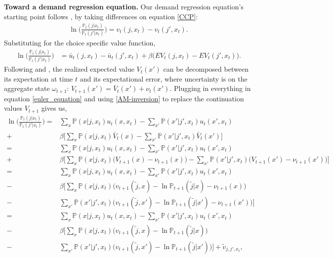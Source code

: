 \documentclass[11pt]{article}
\newcommand{\Prob}{\mathbb{P}}
\newcommand{\Paragraph}{\vspace{0.1cm}\noindent\textbf}
\begin{document}
\Paragraph{Toward a demand regression equation.} 
Our demand regression equation's starting point follows \cite{hotz1993conditional}, by taking differences on equation \eqref{CCP}:
\begin{align}
    \ln \Big( \frac{\Prob_t(j|x_{t})}{\Prob_t(j'|x_{t})}\Big)= v_t(j,x_{t})-v_t(j',x_{t}). 
\end{align} 
Substituting for the choice specific value function,
\begin{align}
    \ln \Big( \frac{\Prob_t(j|x_{t})}{\Prob_t(j'|x_{t})}\Big) &= \bar{u}_t(j,x_{t})- \bar{u}_t(j',x_{t})+\beta\big(EV_t(j,x_{t})-EV_t(j',x_{t})\big) . \label{euler_equation}
\end{align}  
Following \cite{scott2013dynamic} and \cite{kalouptsidi2021linear}, the realized expected value ${V}_t(x')$ can be decomposed between its expectation at time $t$ and its expectational error, where uncertainty is on the aggregate state $\omega_{t+1}$: $  {V}_{t+1}(x') = \bar{V}_{t}(x') + \nu_{t}(x').$ Plugging in everything in equation \eqref{euler_equation} and using \ref{AM-inversion} to replace the continuation values ${V}_{t+1}$ gives us,
\begin{align*}
 \ln \Big( \frac{\Prob_t(j|x_{t})}{\Prob_t(j'|x_{t})}\Big)=&\sum_{x} \Prob(x|j,x_{t})u_t(x,x_t)- \sum_{x'} \Prob(x'|j',x_{t})u_t(x',x_t)\nonumber \\
+&\beta\Bigg[\sum_{x} \Prob(x|j,x_{t}) \bar{V}_{t}(x) -\sum_{x'} \Prob(x'|j',x_{t}) \bar{V}_{t}(x')\Bigg] \\
=&\sum_{x} \Prob(x|j,x_{t})u_t(x,x_t)- \sum_{x'} \Prob(x'|j',x_{t})u_t(x',x_t)\nonumber \\
+&\beta\Bigg[\sum_{x} \Prob(x|j,x_{t}) \big({V}_{t+1}(x) -\nu_{t+1}(x)\big)  -\sum_{x'} \Prob(x'|j',x_{t}) \big({V}_{t+1}(x') -\nu_{t+1}(x')\big) \Bigg] \\
=&\sum_{x} \Prob(x|j,x_{t})u_t(x,x_t)- \sum_{x'} \Prob(x'|j',x_{t})u_t(x',x_t)\nonumber \\
-&\beta\Bigg[\sum_{x} \Prob(x|j,x_{t}) \big(v_{t+1}(\tilde{j},x) - \ln \Prob_{t+1}(\tilde{j}|x) -\nu_{t+1}(x)\big) \\
-&\sum_{x'} \Prob(x'|j',x_{t}) \big(v_{t+1}(\tilde{j},x') - \ln \Prob_{t+1}(\tilde{j}|x') -\nu_{t+1}(x')\big) \Bigg]  \\
=&\sum_{x} \Prob(x|j,x_{t})u_t(x,x_t)- \sum_{x'} \Prob(x'|j',x_{t})u_t(x',x_t)\nonumber \\
-&\beta\Bigg[\sum_{x} \Prob(x|j,x_{t}) \big(v_{t+1}(\tilde{j},x) - \ln \Prob_{t+1}(\tilde{j}|x)) \\
-&\sum_{x'} \Prob(x'|j',x_{t}) \big(v_{t+1}(\tilde{j},x') - \ln \Prob_{t+1}(\tilde{j}|x')) \Bigg]+ \tilde{v}_{j,j',x_{t}},
\end{align*} 
\end{document}
